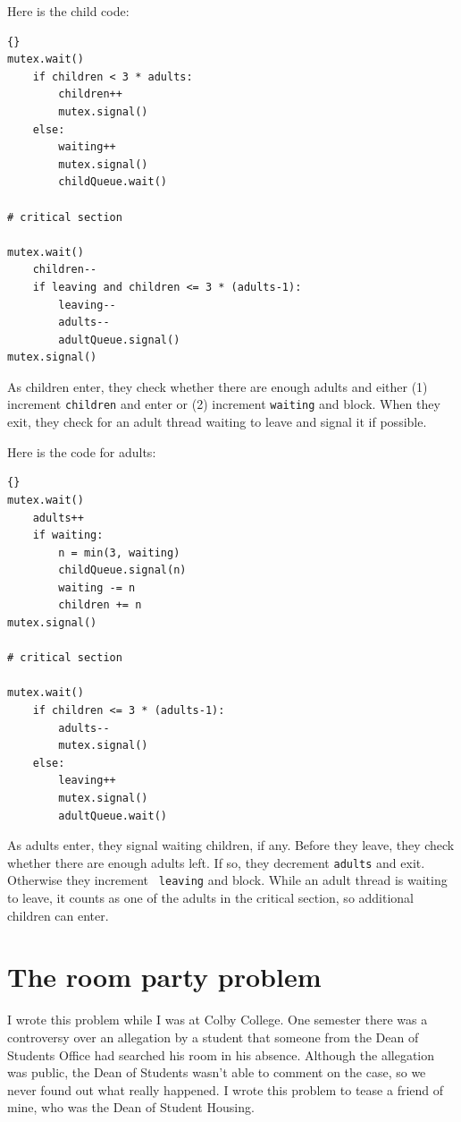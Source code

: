 \documentclass{book}
\begin{document}
Here is the child code:

\begin{lstlisting}[title={Extended child care solution (child)}]{}
mutex.wait()
    if children < 3 * adults:
        children++
        mutex.signal()
    else:
        waiting++
        mutex.signal()
        childQueue.wait()

# critical section

mutex.wait()
    children--
    if leaving and children <= 3 * (adults-1):
        leaving--
        adults--
        adultQueue.signal() 
mutex.signal()
\end{lstlisting}

As children enter, they check whether there are enough adults
and either (1) increment {\tt children} and enter or (2) increment
{\tt waiting} and block.
When they exit, they check for an adult thread waiting to leave and
signal it if possible.

\newpage
Here is the code for adults:

\begin{lstlisting}[title={Extended child care solution (adult)}]{}
mutex.wait()
    adults++
    if waiting:
        n = min(3, waiting)
        childQueue.signal(n)
        waiting -= n
        children += n
mutex.signal()

# critical section

mutex.wait()
    if children <= 3 * (adults-1):
        adults--
        mutex.signal()
    else:
        leaving++
        mutex.signal()
        adultQueue.wait() 
\end{lstlisting}

As adults enter, they signal waiting children, if any.  Before they
leave, they check whether there are enough adults left.  If so, they
decrement {\tt adults} and exit.  Otherwise they increment {\tt
leaving} and block.  While an adult thread is waiting to leave, it
counts as one of the adults in the critical section, so additional
children can enter.





\newpage
\section{The room party problem}

I wrote this problem while I was at Colby College.  One semester
there was a controversy over an allegation by a student that someone
from the Dean of Students Office had searched his room in his
absence.  Although the allegation was public, the Dean of Students
wasn't able to comment on the case, so we never found out what
really happened.  I wrote this problem to tease a friend of mine,
who was the Dean of Student Housing.
\end{document}

